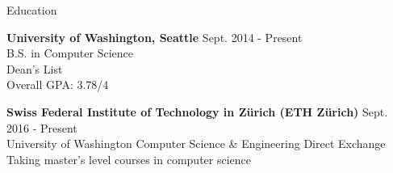 \documentclass{resume} %
\begin{document}

\begin{rSection}{Education}

  {\bf University of Washington, Seattle} \hfill {Sept. 2014 - Present} \\
  B.S. in Computer Science \\
  Dean's List \\
  Overall GPA: 3.78/4

  {\bf Swiss Federal Institute of Technology in Z\"{u}rich (ETH Z\"{u}rich)} \hfill {Sept. 2016 - Present} \\
  University of Washington Computer Science \& Engineering Direct Exchange  \\
  Taking master's level courses in computer science

\end{rSection}

\end{document}
